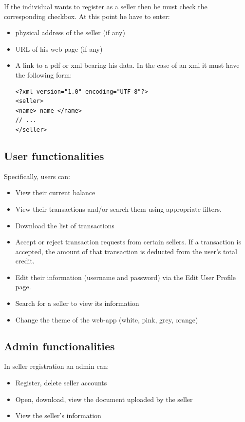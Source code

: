\documentclass[]{article}
\begin{document}
If the individual wants to register as a seller then he must check the corresponding checkbox. At this point he have to enter: 
\begin{itemize}
    \item physical address of the seller (if any)
    \item URL of his web page (if any)
    \item A link to a pdf or xml bearing his data. In the case of an xml it must have the following form:
     {
\begin{lstlisting}
<?xml version="1.0" encoding="UTF-8"?>
<seller>
<name> name </name>
// ...
</seller> 
\end{lstlisting}
    }
\end{itemize}

\subsection{User functionalities}
Specifically, users can:
\begin{itemize}
    \item View their current balance
    \item View their transactions and/or search them using appropriate filters.
    \item Download the list of transactions
    \item Accept or reject transaction requests from certain sellers. If a transaction is accepted, the amount of that transaction is deducted from the user's total credit.
    \item Edit their information (username and password) via the Edit User Profile page.
    \item Search for a seller to view its information
    \item Change the theme of the web-app (white, pink, grey, orange) 
\end{itemize}

\subsection{Admin functionalities}


In seller registration an admin can:
\begin{itemize}
    \item Register, delete seller accounts
    \item Open, download, view the document uploaded by the seller
    \item View the seller's information
\end{itemize}
\end{document}

